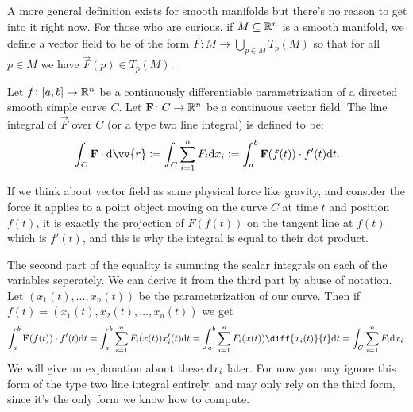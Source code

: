 \documentclass[11pt,a4paper]{article}
\begin{document}
\begin{remark}
  A more general definition exists for smooth manifolds 
  but there's no reason to get into it right now.
  For those who are curious,
  if $M \subseteq \mathbb{R}^n$ is a smooth manifold,
  we define a vector field to be of the form
  $\vec F \colon M \to \bigcup_{p \in M}{T_p(M)}$
  so that for all $p \in M$ we have $\vec F(p) \in T_p(M)$.
\end{remark}

\begin{definition}
  \label{def:type-two-line-integral}
  Let $f \colon [a,b] \to \mathbb{R}^n$ be a continuously differentiable
  parametrization of a directed smooth simple curve $C$.
  Let $\boldsymbol{\mathbf{F}} \colon C \to \mathbb{R}^n$ be a continuous vector field.
  The line integral of $\vec F$ over $C$ (or a type two
  line integral) is defined to be:
  \[
    \int_{C} \vec F \cdot \dif \vv{r} := 
    \int_{C} \sum_{i=1}^{n} F_i \dx_i :=
    \int_{a}^{b} \vec F(f(t)) \cdot f'(t) \dt.
  \]
\end{definition}

\begin{remark}
  If we think about vector field as some physical force like gravity,
  and consider the force it applies to a point object moving on the
  curve $C$ at time $t$ and position $f(t)$,
  it is exactly the projection of $F(f(t))$ on
  the tangent line at $f(t)$ which is $f'(t)$, and this is why
  the integral is equal to their dot product.
\end{remark}

\begin{remark}
  The second part of the equality is summing the scalar integrals
  on each of the variables seperately.
  We can derive it from the third part by abuse of notation.
  Let $(x_1(t),\dots,x_n(t))$ be the parameterization of our curve.
  Then if $f(t) = (x_1(t),x_2(t),\dots,x_n(t))$ we get
  \[
    \int_{a}^{b} \vec F(f(t)) \cdot f'(t) \dt =
    \int_{a}^{b} \sum_{i=1}^{n} F_i(x(t)) x_i'(t) \dt =
    \int_{a}^{b} \sum_{i=1}^{n} F_i(x(t)) \diff{{x_i(t)}}{t} \dt =
    \int_{C} \sum_{i=1}^{n} F_i \dx_i.
  \]
  We will give an explanation about these $\dx_i$ later.
  For now you may ignore this form of the type two line integral
  entirely, and may only rely on the third form,
  since it's the only form we know how to compute.
\end{remark}
\end{document}
